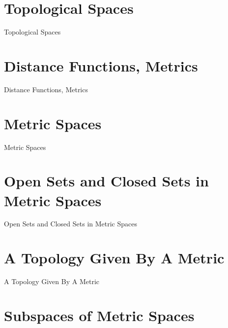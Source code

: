 \section{Topological Spaces}
\label{sec:topological-spaces}

Topological Spaces

\section{Distance Functions, Metrics}
\label{sec:distance-functions-metrics}

Distance Functions, Metrics

\section{Metric Spaces}
\label{sec:metric-spaces}

Metric Spaces

\section{Open Sets and Closed Sets in Metric Spaces}
\label{sec:open-sets-and-closed-sets-in-metric-spaces}

Open Sets and Closed Sets in Metric Spaces

\section{A Topology Given By A Metric}
\label{sec:a-topology-given-by-a-metric}

A Topology Given By A Metric

\section{Subspaces of Metric Spaces}
\label{sec:subspaces-of-metric-spaces}

